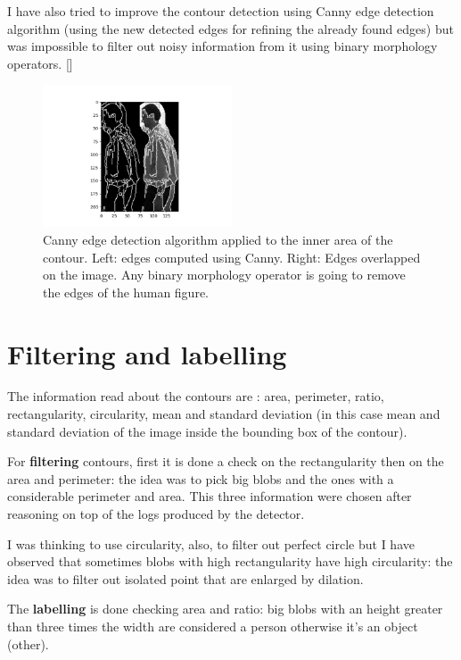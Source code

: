 \documentclass{article}
\newcommand{\CREF}[1]{[\hyperref[#1]{\Cref{#1}}]}
\begin{document}
I have also tried to improve the contour detection using Canny edge detection algorithm (using the new detected edges for refining the already found edges) but was impossible to filter out noisy information from it using binary morphology operators. \CREF{canny}

\begin{figure}
    \centering
    \includegraphics[width=0.5\textwidth,keepaspectratio]{canny.png}
    \caption{Canny edge detection algorithm applied to the inner area of the contour. Left: edges computed using Canny. Right: Edges overlapped on the image. Any binary morphology operator is going to remove the edges of the human figure.}
    \label{canny}
\end{figure}

\section{Filtering and labelling}
The information read about the contours are : area, perimeter, ratio, rectangularity, circularity, mean and standard deviation (in this case mean and standard deviation of the image inside the bounding box of the contour).

For \textbf{filtering} contours, first it is done a check on the rectangularity then on the area and perimeter: the idea was to pick big blobs and the ones with a considerable perimeter and area.
This three information were chosen after reasoning on top of the logs produced by the detector.

I was thinking to use circularity, also, to filter out perfect circle but I have observed that sometimes blobs with high rectangularity have high circularity: the idea was to filter out isolated point that are enlarged by dilation.

The \textbf{labelling} is done checking area and ratio: big blobs with an height greater than three times the width are considered a person otherwise it's an object (other).  

\clearpage
\end{document}
